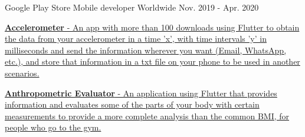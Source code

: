 \begin{cventries}
  \cventry
  {Google Play Store} %
  {Mobile developer} %
  {Worldwide} %
  {Nov. 2019 - Apr. 2020} %
  {
    \begin{cvitems} %
      \item {\href{https://play.google.com/store/apps/details?id=com.grisu.accelerometer}{
                    \textbf{Accelerometer} - An app with more than 100 downloads using Flutter to obtain the data from your accelerometer
                    in a time 'x', with time intervals 'y' in milliseconds and send the information wherever you
                    want (Email, WhatsApp, etc.), and store that information in a txt file on your phone to be
                    used in another scenarios.}}
      \item {\href{https://play.google.com/store/apps/details?id=com.grisu.anthropometric_evaluator}{
                    \textbf{Anthropometric Evaluator} - An application using Flutter that provides information
                    and evaluates some of the parts of your body with certain measurements to provide a more
                    complete analysis than the common BMI, for people who go to the gym.}}
    \end{cvitems}
  }
\end{cventries}

